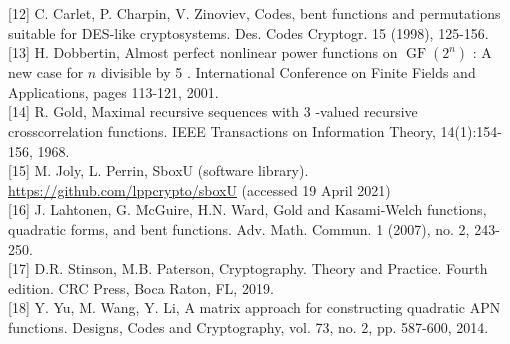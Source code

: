 \documentclass[10pt]{article}
\begin{document}
[12] C. Carlet, P. Charpin, V. Zinoviev, Codes, bent functions and permutations suitable for DES-like cryptosystems. Des. Codes Cryptogr. 15 (1998), 125-156.\\[0pt]
[13] H. Dobbertin, Almost perfect nonlinear power functions on $\operatorname{GF}\left(2^{n}\right)$ : A new case for $n$ divisible by 5 . International Conference on Finite Fields and Applications, pages 113-121, 2001.\\[0pt]
[14] R. Gold, Maximal recursive sequences with 3 -valued recursive crosscorrelation functions. IEEE Transactions on Information Theory, 14(1):154-156, 1968.\\[0pt]
[15] M. Joly, L. Perrin, SboxU (software library). \href{https://github.com/lppcrypto/sboxU}{https://github.com/lppcrypto/sboxU} (accessed 19 April 2021)\\[0pt]
[16] J. Lahtonen, G. McGuire, H.N. Ward, Gold and Kasami-Welch functions, quadratic forms, and bent functions. Adv. Math. Commun. 1 (2007), no. 2, 243-250.\\[0pt]
[17] D.R. Stinson, M.B. Paterson, Cryptography. Theory and Practice. Fourth edition. CRC Press, Boca Raton, FL, 2019.\\[0pt]
[18] Y. Yu, M. Wang, Y. Li, A matrix approach for constructing quadratic APN functions. Designs, Codes and Cryptography, vol. 73, no. 2, pp. 587-600, 2014.
\end{document}
